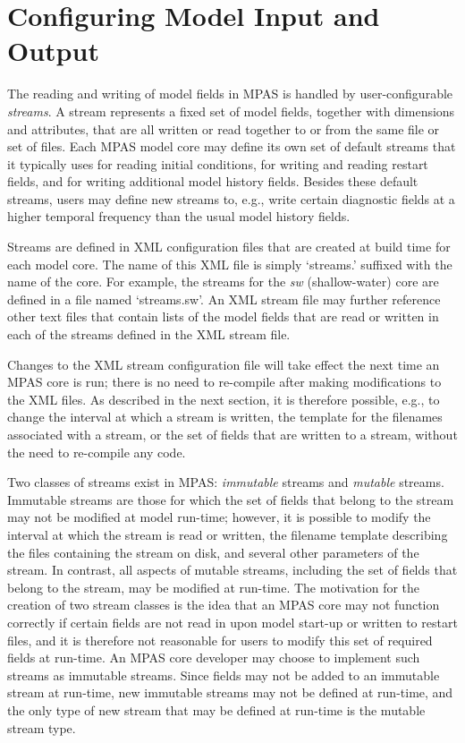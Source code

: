 \chapter{Configuring Model Input and Output}
\label{chap:mpas_io}

\newlength{\immindent}


\newlength{\mutindent}

The reading and writing of model fields in MPAS is handled by user-configurable {\em streams}. 
A stream represents a fixed set of model fields, together with dimensions and attributes, that are
all written or read together to or from the same file or set of files. Each MPAS model core may define
its own set of default streams that it typically uses for reading initial conditions, for writing and reading
restart fields, and for writing additional model history fields. Besides these default streams, users may define
new streams to, e.g., write certain diagnostic fields at a higher temporal frequency than the usual model
history fields.

Streams are defined in XML configuration files that are created at build time for each model core. The name
of this XML file is simply `streams.' suffixed with the name of the core. For example, the streams for
the {\em sw} (shallow-water) core are defined in a file named `streams.sw'. An XML stream
file may further reference other text files that contain lists of the model fields that are read or written in
each of the streams defined in the XML stream file.

Changes to the XML stream configuration file will take effect the next time an MPAS core is run; there is no need
to re-compile after making modifications to the XML files. As described in the next section, it is therefore possible, e.g.,
to change the interval at which a stream is written, the template for the filenames associated with a stream, or the 
set of fields that are written to a stream, without the need to re-compile any code.

Two classes of streams exist in MPAS: {\em immutable} streams and {\em mutable} streams. Immutable streams
are those for which the set of fields that belong to the stream may not be modified at model run-time; however, it is
possible to modify the interval at which the stream is read or written, the filename template describing the files
containing the stream on disk, and several other parameters of the stream. In contrast, all aspects of mutable streams,
including the set of fields that belong to the stream, may be modified at run-time. The motivation for the creation of
two stream classes is the idea that an MPAS core may not function correctly if certain fields are not read in upon 
model start-up or written to restart files, and it is therefore not reasonable for users to modify this set of required fields 
at run-time. An MPAS core developer may choose to implement such streams as immutable streams. Since fields may
not be added to an immutable stream at run-time, new immutable streams may not be defined at run-time, and the only 
type of new stream that may be defined at run-time is the mutable stream type.

